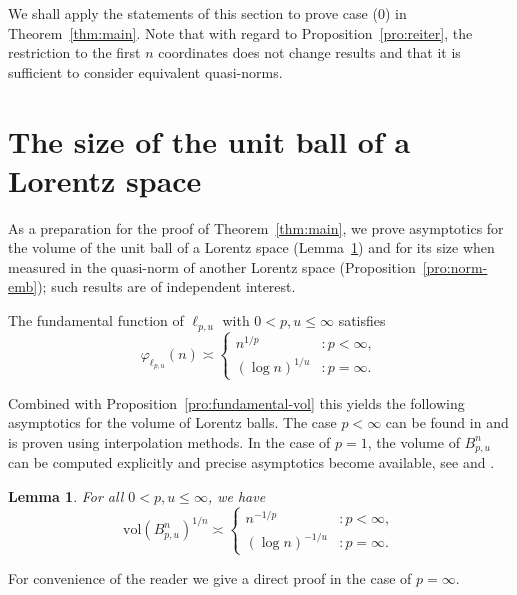 \documentclass[a4paper,12pt]{article}
\newtheorem{lem}[thm]{Lemma}
\theoremstyle{definition}
\newcommand{\vol}{\mathrm{vol}}
\DeclareMathOperator{\id}{id}
\begin{document}
We shall apply the statements of this section to prove case (0) in Theorem~\ref{thm:main}. Note that with regard to Proposition~\ref{pro:reiter}, the restriction to the first $n$ coordinates does not change results and that it is sufficient to consider equivalent quasi-norms. %

\section{The size of the unit ball of a Lorentz space}

As a preparation for the proof of Theorem~\ref{thm:main}, we prove asymptotics for the volume of the unit ball of a Lorentz space (Lemma~\ref{lem:volume}) and for its size when measured in the quasi-norm of another Lorentz space (Proposition~\ref{pro:norm-emb}); such results are of independent interest.

The fundamental function of $\ell_{p,u}$ with $0<p,u\le \infty$ satisfies
\begin{equation} \label{eq:fundamental-lorentz}
	\varphi_{\ell_{p,u}}(n)
\asymp
\begin{cases}
	n^{1/p}&\colon p<\infty,\\
	(\log n)^{1/u} &\colon p=\infty.
\end{cases}
\end{equation}


Combined with Proposition~\ref{pro:fundamental-vol} this yields the following asymptotics for the volume of Lorentz balls. The case $p<\infty$ can be found in \cite[Theorem 7]{DV20} and is proven using interpolation methods. In the case of $p=1$, the volume of $B_{p,u}^n$ can be computed explicitly and precise asymptotics become available, see \cite[Theorem 5]{DV20} and \cite[Corollary 1]{KPS23}. 

\begin{lem}\label{lem:volume}
For all $0<p,u\le \infty$, we have 
\[
\vol(B_{p,u}^n)^{1/n}\asymp 
\begin{cases}
n^{-1/p}  &\colon p<\infty,\\
(\log n)^{-1/u}  &\colon p=\infty.
\end{cases}
\]
\end{lem}

For convenience of the reader we give a direct proof in the case of $p=\infty$.
\end{document}
